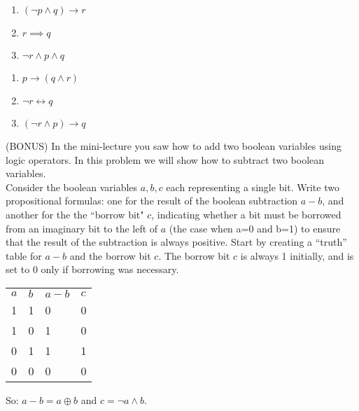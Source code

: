 \documentclass[solution, letterpaper]{cs20inclass}
\begin{document}
\begin{solution}

\subsolution

\begin{enumerate}
\item $(\neg p \land q) \to r$
\item $r \implies q$
\item $\neg r \land p \land q$
\end{enumerate}

\subsolution

\begin{enumerate}
\item $p \to (q \land r)$
\item $\neg r \leftrightarrow q$
\item $(\neg r \land p) \to q$
\end{enumerate}

\end{solution}

\problem (BONUS) In the mini-lecture you saw how to add two boolean variables using logic operators. In this problem we will show how to subtract two boolean variables.\\
Consider the boolean variables $a, b, c$ each representing a single bit. Write two propositional formulas: one for the result of the boolean subtraction $a-b$, and another for the the ``borrow bit" $c$, indicating whether a bit must be borrowed from an imaginary bit to the left of $a$ (the case when a=0 and b=1) to ensure that the result of the subtraction is always positive. Start by creating a ``truth'' table for $a-b$ and the borrow bit $c$. The borrow bit $c$ is always 1 initially, and is set to 0 only if borrowing was necessary. 

\begin{solution}

\begin{table}[]
\centering
\label{my-label}
\begin{tabular}{llll}
$a$ & $b$ & $a-b$ & $c$ \\
1 & 1 & 0   & 0 \\
1 & 0 & 1   & 0 \\
0 & 1 & 1   & 1 \\
0 & 0 & 0   & 0
\end{tabular}
\end{table}

So: $a-b = a \oplus b$ and $c = \neg a \land b$.
 
\end{solution}
\end{document}

